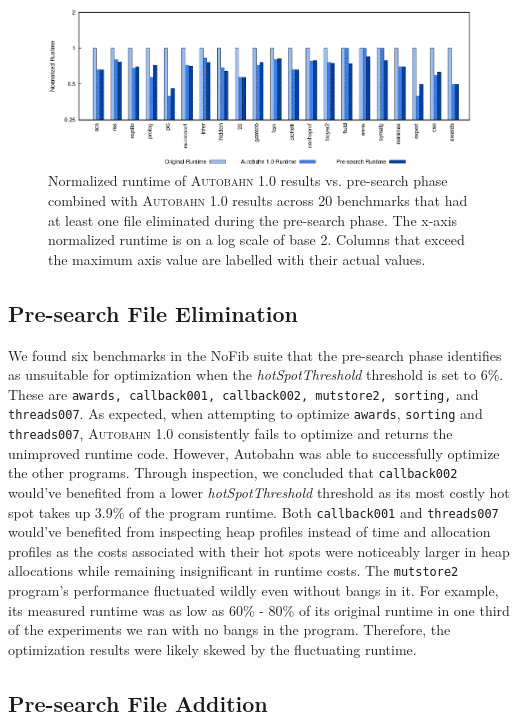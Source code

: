 \documentclass[format=sigplan, review=true]{acmart}
\newcommand{\hotspotcost}[0]{\textit{hotSpotThreshold}}
\newcommand{\Ao}[0]{\textsc{Autobahn 1.0}}
\newcommand{\preopt}[0]{pre-search}
\newcommand{\Preopt}[0]{Pre-search}
\newcommand{\unimp}[0]{unimproved}
\begin{document}
\begin{figure}
\includegraphics[width=\textwidth]{pre-aut}
\caption{Normalized runtime of \Ao{} results vs. \preopt{} phase combined with \Ao{} results across 20 benchmarks that had at least one file eliminated during the \preopt{} phase. The x-axis normalized runtime is on a log scale of base 2. Columns that exceed the maximum axis value are labelled with their actual values.}
\end{figure}

\subsection{\Preopt{} File Elimination}

We found six benchmarks in the NoFib suite that the \preopt{} phase identifies as unsuitable for optimization when the \hotspotcost{} threshold is set to 6\%. These are \texttt{awards, callback001, callback002, mutstore2, sorting,} and \texttt{threads007}. As expected, when attempting to optimize \texttt{awards}, \texttt{sorting} and \texttt{threads007}, \Ao{} consistently fails to optimize and returns the \unimp{} runtime code. However, Autobahn was able to successfully optimize the other programs. Through inspection, we concluded that \texttt{callback002} would've benefited from a lower \hotspotcost{} threshold as its most costly hot spot takes up 3.9\% of the program runtime. Both \texttt{callback001} and \texttt{threads007} would've benefited from inspecting heap profiles instead of time and allocation profiles as the costs associated with their hot spots were noticeably larger in heap allocations while remaining insignificant in runtime costs. The \texttt{mutstore2} program's performance fluctuated wildly even without bangs in it. For example, its measured runtime was as low as 60\% - 80\% of its original runtime in one third of the experiments we ran with no bangs in the program. Therefore, the optimization results were likely skewed by the fluctuating runtime.

\subsection{\Preopt{} File Addition}
\end{document}
